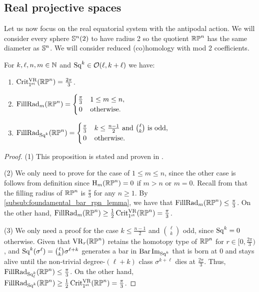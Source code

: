 
\subsection{Real projective spaces}\label{s:first_critical_value_rpn}

Let us now focus on the real equatorial system with the antipodal action.
We will consider every sphere \(\mathbb{S}^n(2)\) to have radius 2 so the quotient \(\mathbb{RP}^n\) has the same diameter as \(\mathbb{S}^n\).
We will consider reduced (co)homology with mod 2 coefficients.

\medskip\proposition
For \(k,\ell,n,m \in \mathbb{N}\) and \(\operatorname{Sq}^k \in \mathcal{O}(\ell, k+\ell)\) we have:
\begin{enumerate}
	\item \(\operatorname{Crit^{\mathrm{VR}}_{1^{\mathrm{st}}}}(\mathbb{RP}^n) = \frac{2\pi}{3}\).
	\item \(\firstdeath{m}{\rp^n} =
	\begin{cases}
		\frac{\pi}{3} & 1 \leq m \leq n, \\
		\hfil 0 & \text{otherwise}.
	\end{cases}\)
	\item \(\firstdeath{\Sq^k}{\rp^n} =
	\begin{cases}
		\tfrac{\pi}{3} & k \leq \frac{n-1}{2} \text{ and } \binom{\ell}{k} \text{ is odd},\\
		\hfil 0 & \text{otherwise}. \\
	\end{cases}\)
\end{enumerate}

\begin{proof}
	(1) This proposition is stated and proven in \cite[Thm.~4.5]{adams2022metric}.

	(2) We only need to prove for the case of $1\leq m\leq n$, since the other case is follows from definition since \(\mathrm{H}_m(\mathbb{RP}^n) = 0\) if \(m > n\) or \(m = 0\).
	Recall from \cite{katz1983filling} that the filling radius of $\mathbb{RP}^n$ is $\frac{\pi}{3}$ for any $n \geq 1$.
	By \cref{subsub:foundamental_bar_rpn_lemma}, we have that $\operatorname{FillRad}_{m}(\mathbb{RP}^n)\leq \tfrac{\pi}{3}$.
	On the other hand, $\operatorname{FillRad}_{m}(\mathbb{RP}^n)\geq \tfrac{1}{2}\operatorname{Crit^{\mathrm{VR}}_{1^{\mathrm{st}}}}(\mathbb{RP}^n) = \tfrac{\pi}{3}$.

	(3) We only need a proof for the case $k \leq \frac{n-1}{2}$ and $\binom{\ell}{k}$ odd, since \(\operatorname{Sq}^k = 0\) otherwise.
	Given that $\mathrm{VR}_r(\mathbb{RP}^n)$ retains the homotopy type of $\mathbb{RP}^n$ for $r \in [0,\tfrac{2\pi}{3})$,  and $\operatorname{Sq}^k(\sigma^\ell) = \binom{\ell}{k}\sigma^{\ell+k}$ generates a bar in $\operatorname{Bar} \operatorname{Im}_{\operatorname{Sq}^k}$ that is born at $0$ and stays alive until the non-trivial degree-$(\ell+k)$ class $\sigma^{k+\ell}$ dies at $\tfrac{2\pi}{3}$.
	Thus, $\operatorname{FillRad}_{\operatorname{Sq}_\ell^k}(\mathbb{RP}^n) \leq \tfrac{\pi}{3}$.
	On the other hand, $\operatorname{FillRad}_{\operatorname{Sq}^k}(\mathbb{RP}^n) \geq \tfrac{1}{2}\operatorname{Crit^{\mathrm{VR}}_{1^{\mathrm{st}}}}(\mathbb{RP}^n) = \tfrac{\pi}{3}$.
\end{proof}


